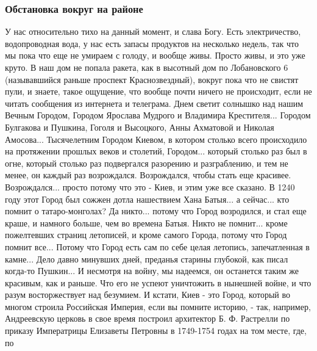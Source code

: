 
 
 
 
 

\subsubsection{Обстановка вокруг на районе}
\label{sec:moje.prizyv.obstanovka_na_rajone}

У нас относительно тихо на данный момент,
и слава Богу. Есть электричество, водопроводная вода, у нас есть запасы
продуктов на несколько недель, так что мы пока что еще не умираем с голоду, и
вообще живы. Просто живы, и это уже круто.  В наш дом не попала ракета, как в
высотный дом по Лобановского 6 (называвшийся раньше проспект Краснозвездный),
вокруг пока что не свистят пули, и знаете, такое ощущение, что вообще почти
ничего не происходит, если не читать сообщения из интернета и телеграма.  Днем
светит солнышко над нашим Вечным Городом, Городом Ярослава Мудрого и Владимира
Крестителя... Городом Булгакова и Пушкина, Гоголя и Высоцкого, Анны Ахматовой и
Николая Амосова... Тысячелетним Городом Киевом, в котором столько всего
происходило на протяжении прошлых веков и столетий, Городом... который столько раз был в
огне, который столько раз подвергался разорению и разграблению, и тем не менее,
он каждый раз возрождался. Возрождался, чтобы стать еще красивее.
Возрождался...  просто потому что это - Киев, и этим уже все сказано. В 1240
году этот Город был сожжен дотла нашествием Хана Батыя... а сейчас... кто
помнит о татаро-монголах?  Да никто...  потому что Город возродился, и стал еще
краше, и намного больше, чем во времена Батыя.  Никто не помнит... кроме
пожелтевших страниц летописей, и кроме самого Города, потому что Город помнит
все... Потому что Город есть сам по себе целая летопись, запечатленная в
камне... Дело давно минувших дней, преданья старины глубокой, как писал
когда-то Пушкин... И несмотря на войну, мы надеемся, он останется таким же
красивым, как и раньше.  Что его не успеют уничтожить в нынешней войне, и что
разум восторжествует над безумием.  И кстати, Киев - это Город, который во
многом строила Российская Империя, если вы помните историю, - так, например,
Андреевскую церковь в свое время построил архитектор Б. Ф. Растрелли по приказу
Императрицы Елизаветы Петровны в 1749-1754 годах на том месте, где, по
